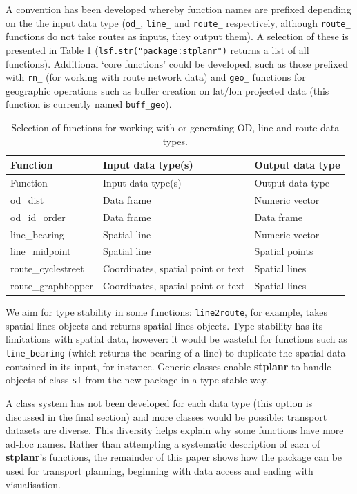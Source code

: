 A convention has been developed whereby function names are
prefixed depending on the the input data type
(\texttt{od\_}, \texttt{line\_} and
\texttt{route\_} respectively, although \texttt{route\_} functions do not take routes as inputs, they output them). A selection of these is presented in
Table 1 (\texttt{lsf.str("package:stplanr")} returns a list of all functions).
Additional `core functions' could be developed, such as those
prefixed with \texttt{rn\_} (for working with route network data) and
\texttt{geo\_} functions for geographic operations such as buffer creation
on lat/lon projected data (this function is currently named
\texttt{buff\_geo}).
\begin{longtable}[]{@{}lll@{}}
\caption{Selection of functions for working with or generating OD, line
and route data types.}\tabularnewline
\toprule
Function & Input data type(s) & Output data type\tabularnewline
\midrule
\endfirsthead
\toprule
Function & Input data type(s) & Output data type\tabularnewline
\midrule
\endhead
od\_dist & Data frame & Numeric vector\tabularnewline
od\_id\_order & Data frame & Data frame\tabularnewline
line\_bearing & Spatial line & Numeric vector\tabularnewline
line\_midpoint & Spatial line & Spatial points\tabularnewline
route\_cyclestreet & Coordinates, spatial point or text & Spatial
lines\tabularnewline
route\_graphhopper & Coordinates, spatial point or text & Spatial
lines\tabularnewline
\bottomrule
\end{longtable}

We aim for type stability in some functions:
\texttt{line2route}, for example, takes spatial lines objects and returns spatial lines objects.
Type stability has its limitations with spatial data, however:
it would be wasteful for functions such as \texttt{line\_bearing} (which returns the bearing of a line) to duplicate the spatial data contained in its input, for instance.
Generic classes enable \textbf{stplanr} to
handle objects of class \texttt{sf} from the new  package
in a type stable way.

A class system has not been developed for each data type (this option is
discussed in the final section) and more classes would be possible:
transport datasets are diverse.
This diversity helps explain why some functions have more ad-hoc names.
Rather than attempting a systematic
description of each of \textbf{stplanr}'s functions, the remainder of this paper shows how the package can be used for transport planning, beginning with data access and ending with visualisation.

